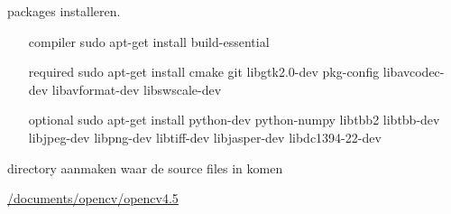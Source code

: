 \documentclass{scrartcl}
\begin{document}
packages installeren. 

\begin{enumerate}[1]
\item [compiler] sudo apt-get install build-essential
\item [required] sudo apt-get install cmake git libgtk2.0-dev pkg-config libavcodec-dev libavformat-dev libswscale-dev
\item [optional] sudo apt-get install python-dev python-numpy libtbb2 libtbb-dev libjpeg-dev libpng-dev libtiff-dev libjasper-dev libdc1394-22-dev
\end{enumerate}
directory aanmaken waar de source files in komen

\href{/Users/larsdepauw/Documents/Lars.nosync/Documents/School/1Ma%20ing/Masterproef/TWI/LaTeX/TussenTijdsVerslag/TexMaker/figdocuments/opencv/opencv4.5}{/documents/opencv/opencv4.5} 
\end{document}
